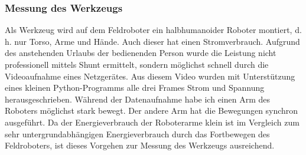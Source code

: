 \subsubsection{Messung des Werkzeugs}
Als Werkzeug wird auf dem Feldroboter ein halbhumanoider Roboter montiert, d. h. nur Torso, Arme und Hände. Auch dieser hat einen Stromverbrauch. Aufgrund des anstehenden Urlaubs der bedienenden Person wurde die Leistung nicht professionell mittels Shunt ermittelt, sondern möglichst schnell durch die Videoaufnahme eines Netzgerätes. Aus diesem Video wurden mit Unterstützung eines kleinen Python-Programms alle drei Frames Strom und Spannung herausgeschrieben. Während der Datenaufnahme habe ich einen Arm des Roboters möglichst stark bewegt. Der andere Arm hat die Bewegungen synchron ausgeführt. Da der Energieverbrauch der Roboterarme klein ist im Vergleich zum sehr untergrundabhängigen Energieverbrauch durch das Fortbewegen des Feldroboters, ist dieses Vorgehen zur Messung des Werkzeugs ausreichend.
